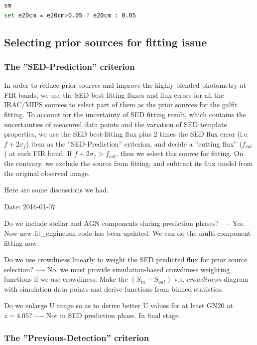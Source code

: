 \documentclass[11pt,a4paper]{article}
\begin{document}
\begin{lstlisting}[language=bash]
sm
set e20cm = e20cm>0.05 ? e20cm : 0.05
\end{lstlisting}


\subsection{Selecting prior sources for fitting issue}

\subsubsection{The ''SED-Prediction'' criterion}

In order to reduce prior sources and improve the highly blended photometry at FIR bands, we use the SED best-fitting fluxes and flux errors for all the IRAC/MIPS sources to select part of them as the prior sources for the galfit fitting. To account for the uncertainty of SED fitting result, which contains the uncertainties of measured data points and the variation of SED template properties, we use the SED best-fitting flux plus 2 times the SED flux error (i.e. $f+2{\sigma}_{f}$) item as the ''SED-Prediction'' criterion, and decide a ''cutting flux'' ($f_{cut}$) at each FIR band. If $f+2{\sigma}_{f}>f_{cut}$, then we select this source for fitting. On the contrary, we exclude the source from fitting, and subtract its flux model from the original observed image. 

Here are some discussions we had. 

\textcolor{green!90!black!60!orange}{Date: 2016-01-07}

Do we include stellar and AGN components during prediction phases? ---- Yes. Now new fit\_engine.sm code has been updated. We can do the multi-component fitting now. 

Do we use crowdiness linearly to weight the SED predicted flux for prior source selection? ---- No, we must provide simulation-based crowdiness weighting functions if we use crowdiness. Make the $(S_{in}-S_{out})$ v.s. $crowdiness$ diagram with simulation data points and derive functions from binned statistics. 

Do we enlarge U range so as to derive better U values for at least GN20 at $z=4.05$? ---- Not in SED prediction phase. In final stage. 

\subsubsection{The ''Previous-Detection'' criterion}
\end{document}
